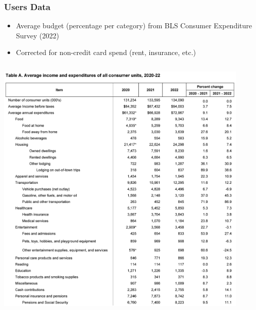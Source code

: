 \begin{frame}
    \frametitle{Users Data}
    \begin{itemize}
        \item Average budget (percentage per category) from BLS Consumer Expenditure Survey (2022)
        \item Corrected for non-credit card spend (rent, insurance, etc.)
    \end{itemize}
    \begin{columns}[c]
        \begin{column}{0.7\textwidth}
        \includegraphics[width=0.95\textwidth]{../Misc/BLSTableA.png}
        \end{column}
        \begin{column}{0.3\textwidth}

\end{column}
\end{columns}
\end{frame}
